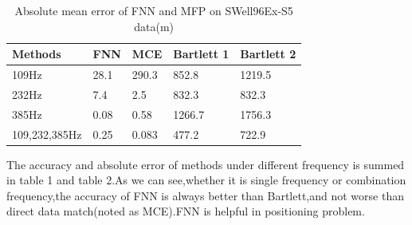 \begin{table}[]
\caption{Absolute mean error of FNN and MFP on SWell96Ex-S5 data(m)}
\label{my-label}
\begin{tabular}{@{}lllll@{}}
\toprule
Methods       & FNN  & MCE   & Bartlett 1 & Bartlett 2 \\ \midrule
109Hz         & 28.1 & 290.3 & 852.8      & 1219.5     \\
232Hz         & 7.4  & 2.5   & 832.3      & 832.3      \\
385Hz         & 0.08 & 0.58  & 1266.7     & 1756.3     \\
109,232,385Hz & 0.25 & 0.083 & 477.2      & 722.9      \\ \bottomrule
\end{tabular}
\end{table}

The accuracy and absolute error of methods under different frequency is summed in table 1 and table 2.As we can see,whether it is single frequency or combination frequency,the accuracy of FNN is always better than Bartlett,and not worse than direct data match(noted as MCE).FNN is helpful in positioning problem.


